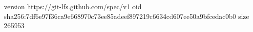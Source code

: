 version https://git-lfs.github.com/spec/v1
oid sha256:7df6e97f36ca9e668970c73ee85adeef897219c6634cd607ee50a9bfcedac0b0
size 265953
